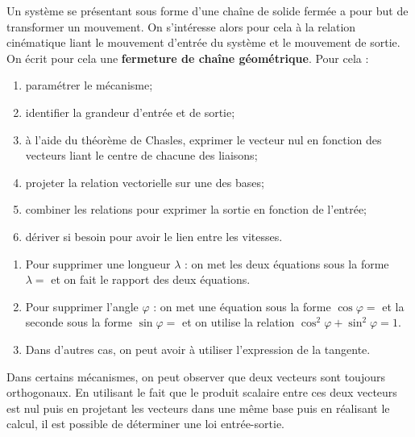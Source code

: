 \begin{methode}

Un système se présentant sous forme d'une chaîne de solide fermée a pour but de transformer un mouvement. On s'intéresse alors pour cela à la relation cinématique liant le mouvement d'entrée du système et le mouvement de sortie. On écrit pour cela une \textbf{fermeture de chaîne géométrique}. Pour cela :
\begin{enumerate}
\item paramétrer le mécanisme;
\item identifier la grandeur d'entrée et de sortie;
\item à l'aide du théorème de Chasles, exprimer le vecteur nul en fonction des vecteurs liant le centre de chacune des liaisons;
\item projeter la relation vectorielle sur une des bases;
\item combiner les relations pour exprimer la sortie en fonction de l'entrée;
\item dériver si besoin pour avoir le lien entre les vitesses. 
\end{enumerate}
\end{methode}


\begin{methode} 
\begin{enumerate}
\item Pour supprimer une longueur $\lambda$ : on met les deux équations sous la forme $\lambda =$ et on fait le rapport des deux équations.
\item Pour supprimer l'angle $\varphi$ : on met une équation sous la forme $\cos\varphi = $ et la seconde sous la forme $\sin\varphi = $ et on utilise la relation $\cos^2\varphi +\sin^2\varphi =1 $.
\item Dans d'autres cas, on peut avoir à utiliser l'expression de la tangente.
\end{enumerate}
\end{methode}


\begin{methode}
Dans certains mécanismes, on peut observer que deux vecteurs sont toujours orthogonaux. En utilisant le fait que le produit scalaire entre ces deux vecteurs est nul puis en projetant les vecteurs dans une même base puis en réalisant le calcul, il est possible de déterminer une loi entrée-sortie.
\end{methode}
%


